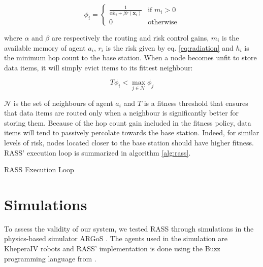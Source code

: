 \begin{equation}
        \phi_i =
        \left\{ 
        \begin{array}{ll}
            \frac{1}{\alpha h_i + \beta r({\bm{x}_i})} &\text{if } m_i > 0 \\
            0 &\text{otherwise}
        \end{array} \right.
        \label{equation:fitness}
\end{equation}

where $\alpha$ and $\beta$ are respectively the routing and risk control gains, $m_i$ is the available memory of agent $a_i$,  $r_i$ is the risk given by eq. \ref{eq:radiation} and $h_i$ is the minimum hop count to the base station. When a node becomes unfit to store data items, it will simply evict items to its fittest neighbour:

\begin{equation}
    T\phi_i < \max_{j \in \mathcal{N}} \phi_j
\end{equation}

$\mathcal{N}$ is the set of neighbours of agent $a_i$ and $T$ is a fitness threshold that ensures that data items are routed only when a neighbour is significantly better for storing them. Because of the hop count gain included in the fitness policy, data items will tend to passively percolate towards the base station. Indeed, for similar levels of risk, nodes located closer to the base station should have higher fitness. RASS' execution loop is summarized in algorithm \ref{alg:rass}. 

\begin{algorithm}[h]
\small
\SetAlgoLined
\DontPrintSemicolon
 \caption{RASS Execution Loop}
 \label{alg:rass}
\end{algorithm}



\section{Simulations}

To assess the validity of our system, we tested RASS through simulations in the physics-based simulator ARGoS \cite{Pinciroli:SI2012}. The agents used
in the simulation are KheperaIV robots \cite{kteam2021kheperaiv} and RASS' implementation is done using the Buzz programming language from \cite{pinciroliBuzz2016}.

